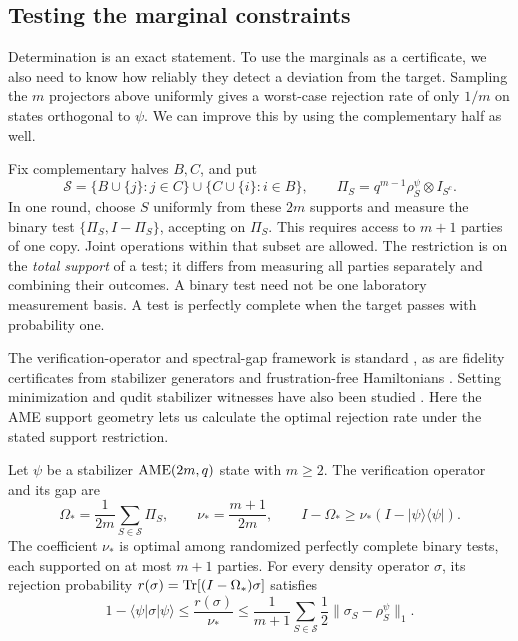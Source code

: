 \subsection{Testing the marginal constraints}
\label{subsec:optimal-marginal-verification}

Determination is an exact statement.  To use the marginals as a certificate,
we also need to know how reliably they detect a deviation from the target.
Sampling the \(m\) projectors above uniformly gives a worst-case rejection
rate of only \(1/m\) on states orthogonal to \(\psi\).  We can improve
this by using the complementary half as well.

Fix complementary halves \(B,C\), and put
\[
 \mathcal S=\{B\cup\{j\}:j\in C\}
       \cup\{C\cup\{i\}:i\in B\},\qquad
 \Pi_S=q^{m-1}\rho_S^\psi\otimes I_{S^c}.
\]
In one round, choose \(S\) uniformly from these \(2m\) supports and
measure the binary test \(\{\Pi_S,I-\Pi_S\}\), accepting on \(\Pi_S\).
This requires access to \(m+1\) parties of one copy.  Joint operations
within that subset are allowed.  The restriction is on the \emph{total
support} of a test; it differs from measuring all parties separately and
combining their outcomes.  A binary test need not be one laboratory
measurement basis.  A test is perfectly complete when the target passes
with probability one.

The verification-operator and spectral-gap framework is standard
\cite{PallisterLindenMontanaro2018,DangniamHanZhu2020}, as are fidelity
certificates from stabilizer generators and frustration-free Hamiltonians
\cite{KalevKyrillidisLinke2019,ZhuLiChen2024}.  Setting minimization and
qudit stabilizer witnesses have also been studied
\cite{LiZhangLiZhu2021,SzczepaniakMakutaAugusiak2026}.
Here the AME support geometry lets us calculate the optimal rejection
rate under the stated support restriction.

\begin{proposition}
\label{prop:complementary-marginal-tests}
Let \(\psi\) be a stabilizer \(\mathrm{AME}(2m,q)\) state with \(m\geq2\).
The verification operator and its gap are
\begin{equation}
 \Omega_* = \frac1{2m}\sum_{S\in\mathcal S}\Pi_S,
 \qquad \nu_* = \frac{m+1}{2m},\qquad
 I-\Omega_*\geq\nu_*(I-|\psi\rangle\langle\psi|).
 \label{eq:complementary-gap}
\end{equation}
The coefficient \(\nu_*\) is optimal among randomized perfectly complete
binary tests, each supported on at most \(m+1\) parties.  For every density
operator \(\sigma\), its rejection probability
\(r(\sigma)=\operatorname{Tr}[(I-\Omega_*)\sigma]\) satisfies
\begin{equation}
 1-\langle\psi|\sigma|\psi\rangle
 \leq\frac{r(\sigma)}{\nu_*}
 \leq\frac1{m+1}\sum_{S\in\mathcal S}
       \frac12\|\sigma_S-\rho_S^\psi\|_1.
 \label{eq:complementary-fidelity}
\end{equation}
\end{proposition}

